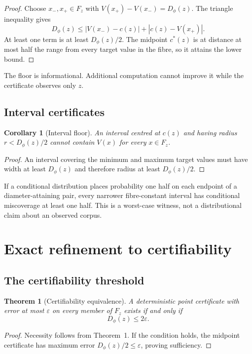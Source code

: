 \documentclass[10pt]{article}
\newtheorem{theorem}{Theorem}
\newtheorem{corollary}{Corollary}
\newcommand{\1}{\mathbf{1}}
\begin{document}
\begin{proof}
Choose $x_-,x_+\in F_z$ with $V(x_+)-V(x_-)=D_\phi(z)$. The triangle inequality gives
\[
  D_\phi(z)\leq |V(x_-)-c(z)|+|c(z)-V(x_+)|.
\]
At least one term is at least $D_\phi(z)/2$. The midpoint $c^*(z)$ is at distance at most half the range from every target value in the fibre, so it attains the lower bound.
\end{proof}

The floor is informational. Additional computation cannot improve it while the certificate observes only $z$.

\subsection{Interval certificates}

\begin{corollary}[Interval floor]
An interval centred at $c(z)$ and having radius $r<D_\phi(z)/2$ cannot contain $V(x)$ for every $x\in F_z$.
\end{corollary}

\begin{proof}
An interval covering the minimum and maximum target values must have width at least $D_\phi(z)$ and therefore radius at least $D_\phi(z)/2$.
\end{proof}

If a conditional distribution places probability one half on each endpoint of a diameter-attaining pair, every narrower fibre-constant interval has conditional miscoverage at least one half. This is a worst-case witness, not a distributional claim about an observed corpus.

\section{Exact refinement to certifiability}
\subsection{The certifiability threshold}

\begin{theorem}[Certifiability equivalence]
A deterministic point certificate with error at most $\varepsilon$ on every member of $F_z$ exists if and only if
\[
  D_\phi(z)\leq 2\varepsilon.
\]
\end{theorem}

\begin{proof}
Necessity follows from Theorem~1. If the condition holds, the midpoint certificate has maximum error $D_\phi(z)/2\leq\varepsilon$, proving sufficiency.
\end{proof}
\end{document}
